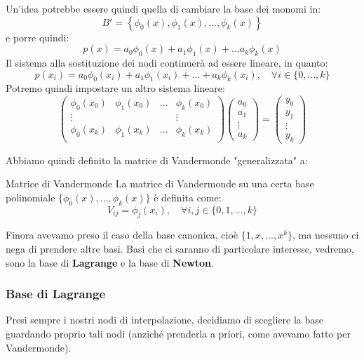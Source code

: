 \documentclass[a4paper,11pt]{article}
\begin{document}
\par\medskip

Un'idea potrebbe essere quindi quella di cambiare la base dei monomi in:
$$
B' = \left\{ \phi_0(x), \phi_1(x), ..., \phi_k(x) \right\}
$$
e porre quindi:
$$
p(x) = a_0 \phi_0(x) + a_1 \phi_1(x) + ... a_k \phi_k(x)
$$
Il sistema alla sostituzione dei nodi continuerà ad essere lineare, in quanto:
$$
p(x_i) = a_0 \phi_0(x_i) + a_1 \phi_1(x_i) + ... + a_k \phi_k(x_i), \quad \forall i \in \{ 0, ..., k \}
$$
Potremo quindi impostare un altro sistema lineare:
$$
\begin{pmatrix}
	\phi_0(x_0) & \phi_1(x_0) & ... & \phi_k(x_0) \\ 
	\vdots & & & \vdots \\
	\phi_0(x_k) & \phi_1(x_k) & ... & \phi_k(x_k) \\ 
\end{pmatrix}
\begin{pmatrix}
	a_0 \\ a_1 \\ \vdots \\ a_k
\end{pmatrix}
=
\begin{pmatrix}
	y_0 \\ y_1 \\ \vdots \\ y_k
\end{pmatrix}
$$

Abbiamo quindi definito la matrice di Vandermonde "generalizzata" a:
\begin{definition}{Matrice di Vandermonde}
	La matrice di Vandermonde su una certa base polinomiale $\{\phi_0(x), ..., \phi_k(x)\}$ è definita come:
$$
V_{ij} = \phi_j(x_i), \quad \forall i, j \in \{0, 1, ..., k\}
$$
\end{definition}
Finora avevamo preso il caso della base canonica, cioè $\{1, x, ..., x^k\}$, ma nessuno ci nega di prendere altre basi.
Basi che ci saranno di particolare interesse, vedremo, sono la base di \textbf{Lagrange} e la base di \textbf{Newton}.


\subsubsection{Base di Lagrange}
Presi sempre i nostri nodi di interpolazione, decidiamo di scegliere la base guardando proprio tali nodi (anziché prenderla a priori, come avevamo fatto per Vandermonde).
\end{document}
